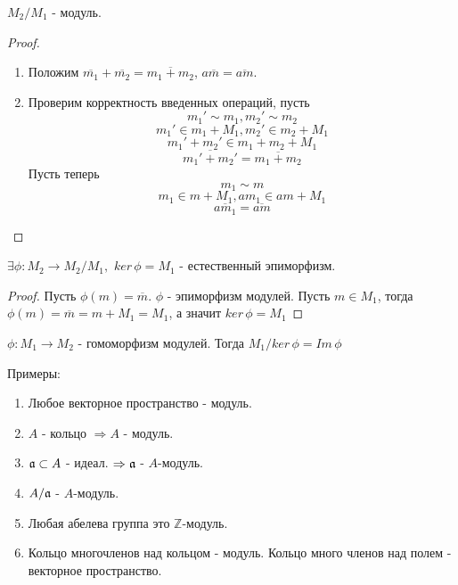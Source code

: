 \begin{thm}
  $ M_2/M_1 $ - модуль. 
\end{thm}

\begin{proof}
  \begin{enumerate}
    \item Положим $ \overline{m_1} + \overline{m_2} = \overline{m_1 + m_2} $, $ a\overline{m} = \overline{am} $.
    \item Проверим корректность введенных операций, пусть 
      \[ m_1' \sim m_1, m_2' \sim m_2 \]
      \[ m_1' \in m_1 + M_1, m_2' \in m_2 + M_1 \]
      \[ m_1' + m_2' \in m_1 + m_2 + M_1 \]
      \[ \overline{m_1' + m_2'} = \overline{m_1 + m_2} \]
      Пусть теперь 
      \[ m_1 \sim m \]
      \[ m_1 \in m + M_1, am_1 \in am + M_1 \]
      \[ \overline{am_1} = \overline{am} \]
  \end{enumerate}
\end{proof}

\begin{thm}
  $ \exists \phi : M_2 \rightarrow M_2/M_1, $ $ ker \, \phi = M_1 $ - естественный эпиморфизм.
\end{thm}

\begin{proof}
  Пусть $ \phi(m) = \overline{m} $. $\phi $ - эпиморфизм модулей. Пусть $ m \in M_1 $, тогда
  $ \phi(m) = \overline{m} = m + M_1 = M_1 $, а значит $ ker \, \phi = M_1 $
\end{proof}

\begin{thm}
  $ \phi : M_1 \rightarrow M_2 $ - гомоморфизм модулей. Тогда $ M_1/ker \, \phi = Im \, \phi $
\end{thm}

Примеры:
\begin{enumerate}
  \item Любое векторное пространство - модуль.
  \item $ A $ - кольцо $ \Rightarrow A $ - модуль.
  \item $ \mathfrak{a} \subset A $ - идеал. $ \Rightarrow \mathfrak{a} $ - $A$-модуль. 
  \item $ A / \mathfrak{a} $ - $A$-модуль.
  \item Любая абелева группа это $ \mathbb{Z}$-модуль.
  \item Кольцо многочленов над кольцом - модуль. Кольцо много членов над полем - векторное пространство.
\end{enumerate}
